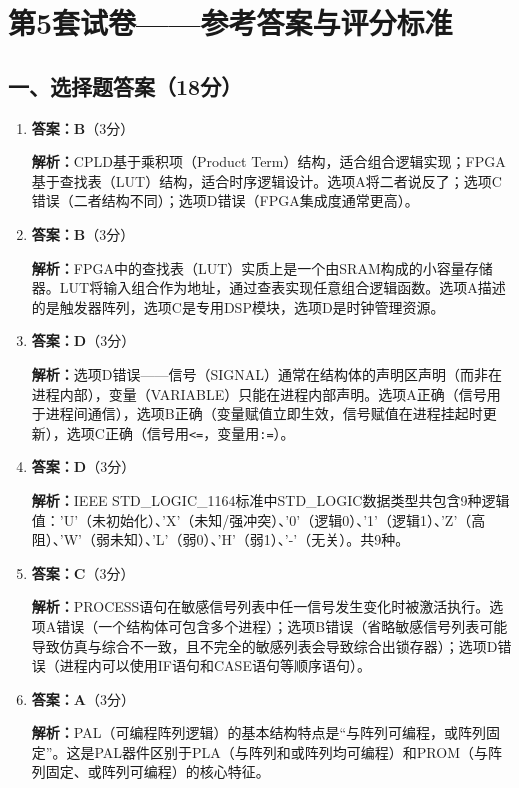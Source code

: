 \chapter{第5套试卷——参考答案与评分标准}

\section{一、选择题答案（18分）}

\begin{enumerate}[label=\arabic*., leftmargin=*]

\item \textbf{答案：B}（3分）

\textbf{解析：}CPLD基于乘积项（Product Term）结构，适合组合逻辑实现；FPGA基于查找表（LUT）结构，适合时序逻辑设计。选项A将二者说反了；选项C错误（二者结构不同）；选项D错误（FPGA集成度通常更高）。

\item \textbf{答案：B}（3分）

\textbf{解析：}FPGA中的查找表（LUT）实质上是一个由SRAM构成的小容量存储器。LUT将输入组合作为地址，通过查表实现任意组合逻辑函数。选项A描述的是触发器阵列，选项C是专用DSP模块，选项D是时钟管理资源。

\item \textbf{答案：D}（3分）

\textbf{解析：}选项D错误——信号（SIGNAL）通常在结构体的声明区声明（而非在进程内部），变量（VARIABLE）只能在进程内部声明。选项A正确（信号用于进程间通信），选项B正确（变量赋值立即生效，信号赋值在进程挂起时更新），选项C正确（信号用\verb|<=|，变量用\verb|:=|）。

\item \textbf{答案：D}（3分）

\textbf{解析：}IEEE STD\_LOGIC\_1164标准中STD\_LOGIC数据类型共包含9种逻辑值：'U'（未初始化）、'X'（未知/强冲突）、'0'（逻辑0）、'1'（逻辑1）、'Z'（高阻）、'W'（弱未知）、'L'（弱0）、'H'（弱1）、'-'（无关）。共9种。

\item \textbf{答案：C}（3分）

\textbf{解析：}PROCESS语句在敏感信号列表中任一信号发生变化时被激活执行。选项A错误（一个结构体可包含多个进程）；选项B错误（省略敏感信号列表可能导致仿真与综合不一致，且不完全的敏感列表会导致综合出锁存器）；选项D错误（进程内可以使用IF语句和CASE语句等顺序语句）。

\item \textbf{答案：A}（3分）

\textbf{解析：}PAL（可编程阵列逻辑）的基本结构特点是“与阵列可编程，或阵列固定”。这是PAL器件区别于PLA（与阵列和或阵列均可编程）和PROM（与阵列固定、或阵列可编程）的核心特征。

\end{enumerate}

